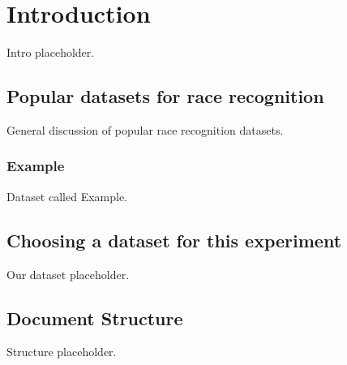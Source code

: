 \chapter{Introduction}
\label{introduction}
Intro placeholder.

\section{Popular datasets for race recognition}
\label{introduction:datasets}
General discussion of popular race recognition datasets.
\subsection{Example}
\label{introduction:datasets:example}
Dataset called Example.

\section{Choosing a dataset for this experiment}
\label{introduction:ourdataset} 
Our dataset placeholder.

\section{Document Structure}
\label{introduction:structure} 
Structure placeholder.



